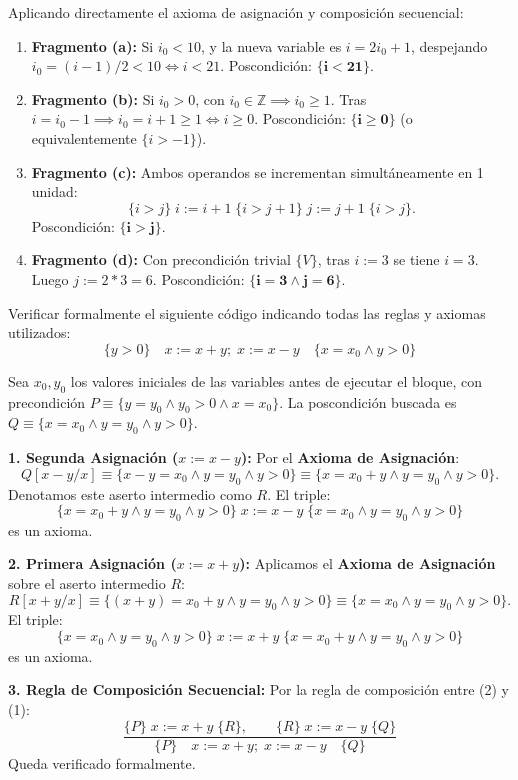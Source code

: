 \begin{solucion}
Aplicando directamente el axioma de asignación y composición secuencial:
\begin{enumerate}[label=(\alph*),leftmargin=*]
    \item \textbf{Fragmento (a):} Si $i_0 < 10$, y la nueva variable es $i = 2i_0 + 1$, despejando $i_0 = (i - 1)/2 < 10 \iff i < 21$.
    Poscondición: $\mathbf{\{i < 21\}}$.
    \item \textbf{Fragmento (b):} Si $i_0 > 0$, con $i_0 \in \mathbb{Z} \implies i_0 \ge 1$. Tras $i = i_0 - 1 \implies i_0 = i + 1 \ge 1 \iff i \ge 0$.
    Poscondición: $\mathbf{\{i \ge 0\}}$ (o equivalentemente $\{i > -1\}$).
    \item \textbf{Fragmento (c):} Ambos operandos se incrementan simultáneamente en 1 unidad:
    \[
    \{i > j\} \; i := i + 1 \; \{i > j + 1\} \; j := j + 1 \; \{i > j\}.
    \]
    Poscondición: $\mathbf{\{i > j\}}$.
    \item \textbf{Fragmento (d):} Con precondición trivial $\{V\}$, tras $i := 3$ se tiene $i = 3$. Luego $j := 2 * 3 = 6$.
    Poscondición: $\mathbf{\{i = 3 \land j = 6\}}$.
\end{enumerate}
\end{solucion}

\begin{ejercicio}
Verificar formalmente el siguiente código indicando todas las reglas y axiomas utilizados:
\[
\{y > 0\} \quad x := x + y; \; x := x - y \quad \{x = x_0 \land y > 0\}
\]
\end{ejercicio}

\begin{solucion}
Sea $x_0, y_0$ los valores iniciales de las variables antes de ejecutar el bloque, con precondición $P \equiv \{y = y_0 \land y_0 > 0 \land x = x_0\}$.
La poscondición buscada es $Q \equiv \{x = x_0 \land y = y_0 \land y > 0\}$.

\textbf{1. Segunda Asignación ($x := x - y$):}
Por el \textbf{Axioma de Asignación}:
\[
Q[x - y / x] \equiv \{x - y = x_0 \land y = y_0 \land y > 0\} \equiv \{x = x_0 + y \land y = y_0 \land y > 0\}.
\]
Denotamos este aserto intermedio como $R$. El triple:
\[
\{x = x_0 + y \land y = y_0 \land y > 0\} \; x := x - y \; \{x = x_0 \land y = y_0 \land y > 0\}
\]
es un axioma.

\textbf{2. Primera Asignación ($x := x + y$):}
Aplicamos el \textbf{Axioma de Asignación} sobre el aserto intermedio $R$:
\[
R[x + y / x] \equiv \{(x + y) = x_0 + y \land y = y_0 \land y > 0\} \equiv \{x = x_0 \land y = y_0 \land y > 0\}.
\]
El triple:
\[
\{x = x_0 \land y = y_0 \land y > 0\} \; x := x + y \; \{x = x_0 + y \land y = y_0 \land y > 0\}
\]
es un axioma.

\textbf{3. Regla de Composición Secuencial:}
Por la regla de composición entre (2) y (1):
\[
\frac{\{P\} \; x := x + y \; \{R\}, \qquad \{R\} \; x := x - y \; \{Q\}}{\{P\} \quad x := x + y; \; x := x - y \quad \{Q\}}
\]
Queda verificado formalmente.
\end{solucion}

